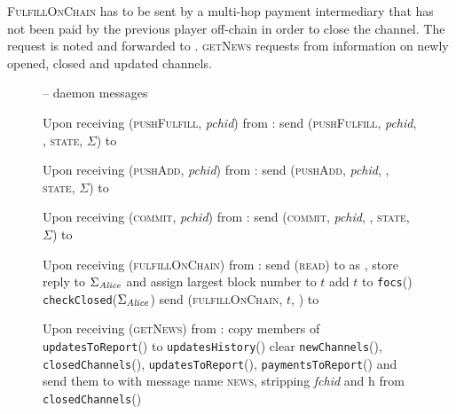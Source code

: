   \textsc{FulfillOnChain} has to be sent by a multi-hop payment intermediary
  that has not been paid by the previous player off-chain in order to close the
  channel. The request is noted and forwarded to \simulator. \textsc{getNews}
  requests from \fpaynet{} information on newly opened, closed and updated
  channels.

  \begin{figure}[H]
    \begin{systembox}{\fpaynet{} -- daemon messages}
      \begin{algorithmic}[1]
        \State Upon receiving (\textsc{pushFulfill}, \textit{pchid}) from
        \alice:
        \Indent
          \State send (\textsc{pushFulfill}, \textit{pchid}, \alice,
          \textsc{state}, $\Sigma$) to \simulator
          \label{alg:fpaynet:daemon:fulfill}
        \EndIndent
        \Statex

        \State Upon receiving (\textsc{pushAdd}, \textit{pchid}) from \alice:
        \Indent
          \State send (\textsc{pushAdd}, \textit{pchid}, \alice, \textsc{state},
          $\Sigma$) to \simulator
          \label{alg:fpaynet:daemon:add}
        \EndIndent
        \Statex

        \State Upon receiving (\textsc{commit}, \textit{pchid}) from \alice:
        \Indent
          \State send (\textsc{commit}, \textit{pchid}, \alice, \textsc{state},
          $\Sigma$) to \simulator
          \label{alg:fpaynet:daemon:commit}
        \EndIndent
        \Statex

        \State Upon receiving (\textsc{fulfillOnChain}) from \alice:
        \Indent
          \State send (\textsc{read}) to \ledger{} as \alice{}, store reply to
          $\Sigma_{\mathit{Alice}}$ and assign largest block number to $t$
          \label{alg:fpaynet:daemon:foc:read}
          \State add $t$ to \texttt{focs}(\alice)
          \State \texttt{checkClosed}($\Sigma_{\mathit{Alice}}$)
          \State send (\textsc{fulfillOnChain}, $t$, \alice) to \simulator
        \EndIndent
        \Statex

        \State Upon receiving (\textsc{getNews}) from \alice:
        \label{alg:fpaynet:getnews}
        \Indent
          \State copy members of \texttt{updatesToReport}(\alice) to
          \texttt{updatesHistory}(\alice)
          \State clear \texttt{newChannels}(\alice),
          \texttt{closedChannels}(\alice), \texttt{updatesToReport}(\alice),
          \texttt{paymentsToReport}(\alice) and send them to \alice{}
          with message name \textsc{news}, stripping \textit{fchid} and h from
          \texttt{closedChannels}(\alice)
          \label{alg:fpaynet:getnews:send}
        \EndIndent
      \end{algorithmic}
    \end{systembox}
    \caption{}
    \label{alg:fpaynet:daemon}
  \end{figure}
